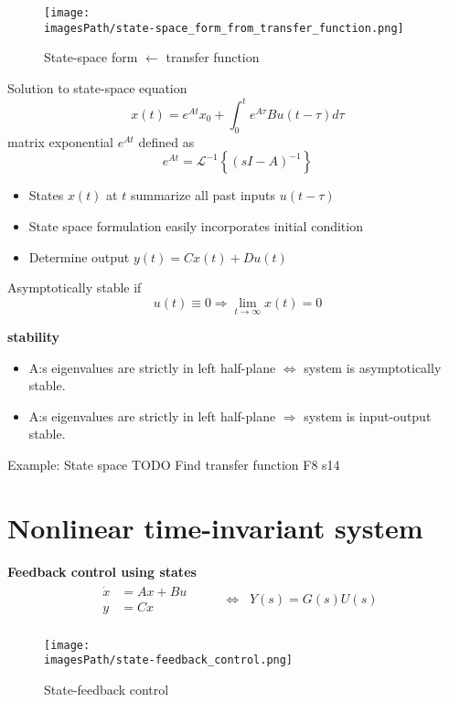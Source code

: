 \begin{figure}[!h]
    \centering
    \texttt{[image: \\imagesPath/state-space\_form\_from\_transfer\_function.png]}
    \caption{State-space form $\leftarrow$ transfer function}
\end{figure}

Solution to state-space equation
\begin{equation*}
    x(t) = e^{At}x_0 + \int_{0}^{t} e^{A\tau} Bu(t-\tau)d\tau
\end{equation*}
matrix exponential $e^{At}$ defined as
\begin{equation*}
    e^{At} = \mathcal{L}^{-1}\left\{ (sI-A)^{-1} \right\}
\end{equation*}

\begin{itemize}
    \item States $x(t)$ at $t$ summarize all past inputs $u(t-\tau)$
    \item State space formulation easily incorporates initial condition
    \item Determine output $y(t) = Cx(t) + Du(t)$
\end{itemize}

Asymptotically stable if 
\begin{equation*}
    u(t) \equiv 0 \Rightarrow \lim_{t\to\infty} x(t) = 0
\end{equation*}

\textbf{stability}
\begin{itemize}
    \item A:s eigenvalues are strictly in left half-plane $\Leftrightarrow$ system is asymptotically stable.
    \item A:s eigenvalues are strictly in left half-plane $\Rightarrow$ system is input-output stable.
\end{itemize}

\begin{exampleblock}{Example: State space}
   TODO  Find transfer function F8 s14
\end{exampleblock}

\section{Nonlinear time-invariant system}
\textbf{Feedback control using states}
\begin{align*}
    \begin{aligned} 
        \dot{x} &= Ax + Bu \\
        y &= Cx 
    \end{aligned}& && \Leftrightarrow \;\; Y(s) = G(s)U(s) \\
\end{align*}
\begin{figure}[!h]
    \centering
    \texttt{[image: \\imagesPath/state-feedback\_control.png]}
    \caption{State-feedback control}
\end{figure}

